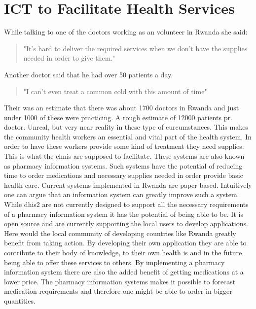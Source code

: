 \cite{overview:rdb}
\cite{rw:snl}

\section{ICT to Facilitate Health Services}
While talking to one of the doctors working as an volunteer in Rwanda she said:
\begin{quotation}
"It's hard to deliver the required services when we don't have the supplies needed in order to give them."
\end{quotation}
Another doctor said that he had over 50 patients a day. 
\begin{quotation}
"I can't even treat a common cold with this amount of time"
\end{quotation}
Their was an estimate that there was about 1700 doctors in Rwanda and just under 1000 of these were practicing.
A rough estimate of 12000 patients pr. doctor. 
Unreal, but very near reality in these type of curcumstances. 
This makes the community health workers an essential and vital part of the health system. 
In order to have these workers provide some kind of treatment they need supplies.
This is what the \gls{clmis} are supposed to facilitate. 
These systems are also known as pharmacy information systems. 
Such systems have the potential of reducing time to order medications and necessary supplies needed in order provide basic health care.
Current systems implemented in Rwanda are paper based. 
Intuitively one can argue that an information system can greatly improve such a system. 
While \gls{dhis2} are not currently designed to support all the necessary requirements of a pharmacy information system it has the potential of being able to be. 
It is open source and are currently supporting the local users to develop applications.
Here would the local community of developing countries like Rwanda greatly benefit from taking action.
By developing their own application they are able to contribute to their body of knowledge, to their own health \gls{is} and in the future being able to offer these services to others.
By implementing a pharmacy information system there are also the added benefit of getting medications at a lower price.
The pharmacy information systems makes it possible to forecast medication requirements and therefore one might be able to order in bigger quantities. 

